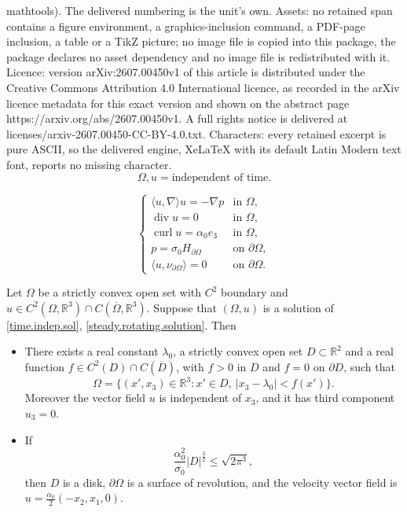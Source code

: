 \documentclass[10pt,a4paper]{amsart}
\newcommand{\Om}{\Omega}
\newcommand{\R}{{\mathbb R}}
\renewcommand{\a}{\alpha}
\newcommand{\curl}{\operatorname{curl}}
\renewcommand{\div}{\operatorname{div}} %
\newcommand{\la}{\langle}
\newcommand{\pa}{\partial}
\newcommand{\ra}{\rangle}
\begin{document}
mathtools). The delivered numbering is the unit's own. Assets: no retained span contains a figure environment, a graphics-inclusion command, a PDF-page inclusion, a table or a TikZ picture; no image file is copied into this package, the package declares no asset dependency and no image file is redistributed with it. Licence: version arXiv:2607.00450v1 of this article is distributed under the Creative Commons Attribution 4.0 International licence, as recorded in the arXiv licence metadata for this exact version and shown on the abstract page https://arxiv.org/abs/2607.00450v1. A full rights notice is delivered at licenses/arxiv-2607.00450-CC-BY-4.0.txt. Characters: every retained excerpt is pure ASCII, so the delivered engine, XeLaTeX with its default Latin Modern text font, reports no missing character.
\begin{equation} \label{time.indep.sol}
\Om, u = \text{independent of time}.
\end{equation}

\begin{equation} \label{steady.rotating.solution}
\begin{cases}
\la u, \nabla \ra  u=-\nabla p   & \text{in } \Omega,
\\
\div u=0 & \text{in } \Omega,
\\
\curl u= \alpha_0 e_3 & \text{in } \Omega,
\\
p=\sigma_0 H_{\pa \Omega} &\text{on } \pa \Omega,
\\
\la u ,\nu_{\pa\Om}\ra =0  &\text{on } \pa \Omega.
\end{cases}
\end{equation}

\begin{theorem}\label{thm:global}
Let $\Omega$ be a strictly convex open set with $C^2$ boundary 
and $u\in C^2(\Omega,\R^3) \cap C(\overline{\Om}, \R^3)$. 
Suppose that $(\Omega,u)$ is a solution of \eqref{time.indep.sol}, \eqref{steady.rotating.solution}.
Then 
\begin{itemize}

\item[$(i)$]
There exists a real constant $\lambda_0$, a strictly convex open set $D\subset \R^2$ 
and a real function $f \in C^2(D) \cap C(\overline{D})$, 
with $f>0$ in $D$ and $f=0$ on $\pa D$, such that
\[
\Omega = \{(x', x_3) \in \R^3 : x' \in D, \ |x_3-\lambda_0| < f(x') \}.
\]
Moreover the vector field $u$ is independent of $x_3$, 
and it has third component $u_3 = 0$. 

\item[$(ii)$]
If 
\begin{equation}\label{eq:sigma.alpha}
\frac{\alpha_0^2}{\sigma_0} |D|^{\frac32} \leq \sqrt{2\pi^3}, 
\end{equation}
then $D$ is a disk, 
$\pa\Om$ is a surface of revolution, 
and the velocity vector field is $u = \frac{\a_0}{2} (-x_2, x_1, 0)$. 
\end{itemize}
\end{theorem}
\end{document}
